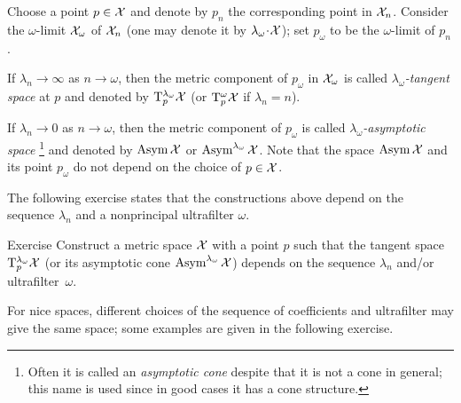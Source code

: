Choose a point $p\in \mathcal{X}$ and denote by $p_n$ the corresponding point in $\mathcal{X}_n$.
Consider the $\omega$-limit $\mathcal{X}_\omega$ of $\mathcal{X}_n$ (one may denote it by $\lambda_\omega\cdot \spc{X}$);
set $p_\omega$ to be the $\omega$-limit of $p_n$.

If $\lambda_n\to \infty$ as $n\to\omega$, then the metric component of $p_\omega$ in $\mathcal{X}_\omega$ is called \emph{$\lambda_\omega$-tangent space} at $p$ and denoted by $\mathrm{T}_p^{\lambda_\omega}\mathcal{X}$ (or $\mathrm{T}_p^{\omega}\mathcal{X}$ if $\lambda_n=n$).\label{page:ultratangent space}

If $\lambda_n\to 0$ as $n\to\omega$, then the metric component of $p_\omega$ is called \emph{$\lambda_\omega$-asymptotic space}%
\footnote{Often it is called an \textit{asymptotic cone} despite that it is not a cone in general; this name is used since in good cases it has a cone structure.} and denoted by $\mathop{\rm Asym}\nolimits\mathcal{X}$ or $\mathop{\rm Asym}\nolimits^{\lambda_\omega}\mathcal{X}$.
Note that the space $\mathop{\rm Asym}\nolimits\mathcal{X}$ and its point $p_\omega$ do not depend on the choice of $p\in \mathcal{X}$.

The following exercise states that the constructions above depend on the sequence $\lambda_n$ and a nonprincipal ultrafilter $\omega$.

\begin{thm}{Exercise}\label{ex:ultraT}
Construct a metric space $\mathcal{X}$ with a point $p$ such that the tangent space
$\mathrm{T}_p^{\lambda_\omega}\mathcal{X}$ (or its asymptotic cone $\mathop{\rm Asym}\nolimits^{\lambda_\omega}\mathcal{X}$) depends on the sequence $\lambda_n$ and/or ultrafilter~$\omega$.
\end{thm}

For nice spaces, different choices of the sequence of coefficients and ultrafilter may give the same space; 
some examples are given in the following exercise.

